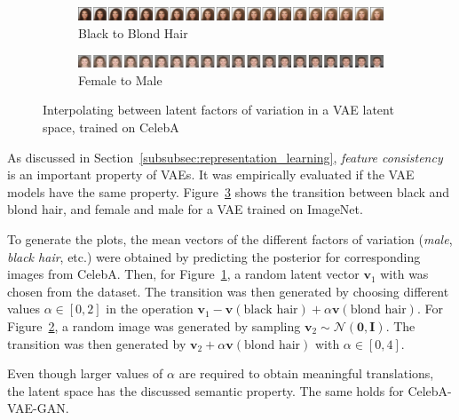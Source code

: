 \begin{figure}
    \centering
    \begin{subfigure}{\textwidth}
        \includegraphics[width=\textwidth]{images/latent_space_traversals/vae_celeba_black_to_blond.png}
        \caption{Black to Blond Hair}
        \label{subfig:black_to_blond}
    \end{subfigure}
    \begin{subfigure}{\textwidth}
        \includegraphics[width=\textwidth]{images/latent_space_traversals/vae_celeba_man_to_woman.png}
        \caption{Female to Male}
        \label{subfig:female_to_male}
    \end{subfigure}
    \caption[Interpolating between black and blond hair, man and woman]{Interpolating between latent factors of variation in a \ac{VAE} latent space, trained on CelebA}
    \label{fig:vae_celeba_black_to_blond_man_to_woman}
\end{figure}

As discussed in Section~\ref{subsubsec:representation_learning}, \textit{feature consistency} is an important property of \acp{VAE}.
It was empirically evaluated if the \ac{VAE} models have the same property.
Figure~\ref{fig:vae_celeba_black_to_blond_man_to_woman} shows the transition between black and blond hair, and female and male for a \ac{VAE} trained on ImageNet.

To generate the plots, the mean vectors of the different factors of variation (\textit{male}, \textit{black hair}, etc.) were obtained by predicting the posterior for corresponding images from CelebA.
Then, for Figure~\ref{subfig:black_to_blond}, a random latent vector $\bm{v}_1$ with  was chosen from the dataset.
The transition was then generated by choosing different values $\alpha \in [0, 2]$ in the operation $\bm{v}_1 - \bm{v}(\text{black hair}) + \alpha\bm{v}(\text{blond hair})$.
For Figure~\ref{subfig:female_to_male}, a random image was generated by sampling $\bm{v}_2\sim \mathcal{N}(\bm{0}, \bm{I})$.
The transition was then generated by $\bm{v}_2 + \alpha\bm{v}(\text{blond hair})$ with $\alpha \in [0, 4]$.

Even though larger values of $\alpha$ are required to obtain meaningful translations, the latent space has the discussed semantic property.
The same holds for CelebA-\ac{VAE}-\ac{GAN}.

